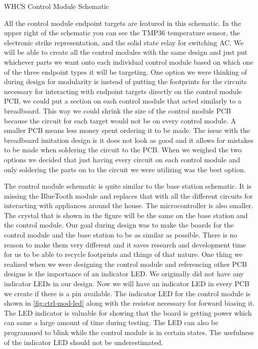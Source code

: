 {WHCS Control Module Schematic}

All the control module endpoint targets are featured in this
schematic. In the upper right of the schematic you can see the TMP36
temperature sensor, the electronic strike representation, and the solid state
relay for switching AC. We will be able to create all the control modules
with the same design and just put whichever parts we want onto each
individual control module based on which one of the three endpoint types it
will be targeting. One option we were thinking of during design for
modularity is instead of putting the footprints for the circuits necessary
for interacting with endpoint targets directly on the control module PCB, we
could put a section on each control module that acted similarly to a
breadboard. This way we could shrink the size of the control module PCB
because the circuit for each target would not be on every control module. A
smaller PCB means less money spent ordering it to be made. The issue with the
breadboard imitation design is it does not look as good and it allows for
mistakes to be made when soldering the circuit to the PCB. When we weighed
the two options we decided that just having every circuit on each control
module and only soldering the parts on to the circuit we were utilizing was the
best option.

The control module schematic is quite similar to the base
station schematic. It is missing the BlueTooth module and replaces that with
all the different circuits for interacting with appliances around the house.
The microcontroller is also smaller. The crystal that is shown in the figure
will be the same on the base station and the control module. Our goal during
design was to make the boards for the control module and the base station to
be as similar as possible.  There is no reason to make them very different
and it saves research and development time for us to be able to recycle
footprints and things of that nature. One thing we realized when we were
designing the control module and referencing other PCB designs is the
importance of an indicator LED. We originally did not have any indicator LEDs
in our design.  Now we will have an indicator LED in every PCB we create if
there is a pin available. The indicator LED for the control module is shown
in \autoref{fig:ctrl-mod-led} along with the resistor necessary for forward biasing
it. The LED indicator is valuable for showing that the board is getting power
which can same a large amount of time during testing. The LED can also be
programmed to blink while the control module is in certain states. The
usefulness of the indicator LED should not be underestimated.

